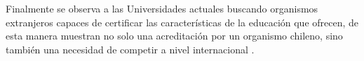 \documentclass[a4paper,12pt,openany,oneside]{book}
\begin{document}
Finalmente se observa a las Universidades actuales buscando organismos extranjeros capaces de certificar las características de la educación que ofrecen, de esta manera muestran no solo una acreditación por un organismo chileno, sino también una necesidad de competir a nivel internacional \cite{data3}.



\end{document}

